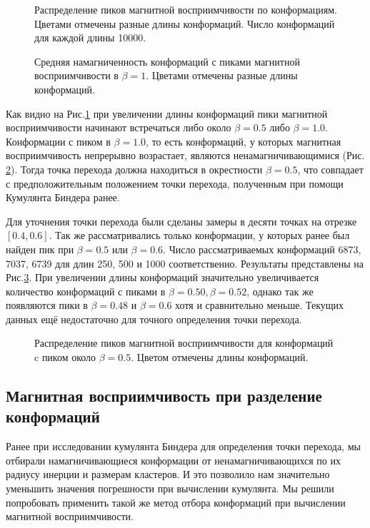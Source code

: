\begin{figure}[htb]
	\centering
	
	\caption{Распределение пиков магнитной восприимчивости по конформациям. Цветами отмечены разные длины конформаций. Число конформаций для каждой длины 10000.}
	\label{fig:ms_peaks}
\end{figure}


\begin{figure}[hbt]
	\centering
	
	\caption{Средняя намагниченность конформаций с пиками магнитной восприимчивости в $\beta = 1$. Цветами отмечены разные длины конформаций.}
	\label{fig:no_peaks_mag2}
\end{figure}


Как видно на Рис.\ref{fig:ms_peaks} при увеличении длины конформаций пики магнитной восприимчивости начинают встречаться либо около $\beta = 0.5$ либо $\beta = 1.0$. Конформации с пиком в $\beta = 1.0$, то есть конформаций, у которых магнитная восприимчивость непрерывно возрастает, являются ненамагничивающимися (Рис. \ref{fig:no_peaks_mag2}). Тогда точка перехода должна находиться в окрестности $\beta = 0.5$, что совпадает с предположительным положением точки перехода, полученным при помощи Кумулянта Биндера \cite{binder_cumulant} ранее.


Для уточнения точки перехода были сделаны замеры в десяти точках на отрезке $[0.4, 0.6]$. Так же рассматривались только конформации, у которых ранее был найден пик при $\beta=0.5$ или $\beta=0.6$. Число рассматриваемых конформаций 6873, 7037, 6739 для длин 250, 500 и 1000 соответственно. Результаты представлены на Рис.\ref{fig:ms_peaks_close}. При увеличении длины конформаций значительно увеличивается количество конформаций с пиками в $\beta = 0.50, \beta = 0.52$, однако так же появляются пики в $\beta = 0.48$ и $ \beta = 0.6$ хотя и сравнительно меньше. Текущих данных ещё недостаточно для точного определения точки перехода.


\begin{figure}[ht]
	\centering
	
	\caption{Распределение пиков магнитной восприимчивости для конформаций c пиком около $\beta = 0.5$. Цветом отмечены длины конформаций.}
	\label{fig:ms_peaks_close}
\end{figure}


\subsection{Магнитная восприимчивость при разделение конформаций}
Ранее при исследовании кумулянта Биндера для определения точки перехода, мы отбирали намагничивающиеся конформации от ненамагничивающихся по их радиусу инерции и размерам кластеров. И это позволило нам значительно уменьшить значения погрешности при вычислении кумулянта. Мы решили попробовать применить такой же метод отбора конформаций при вычислении магнитной восприимчивости.

